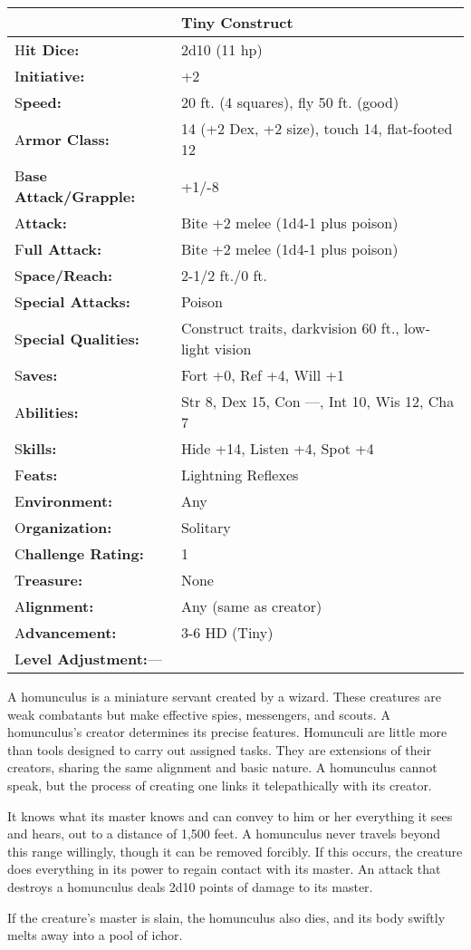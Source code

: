\documentclass{article}
\begin{document}
\begin{tabular}{|>{\raggedright}p{91pt}|>{\raggedright}p{199pt}|}
\hline
  & Tiny Construct\tabularnewline
\hline
H\textbf{it Dice:} & 2d10 (11 hp)\tabularnewline
\hline
I\textbf{nitiative:} & +2\tabularnewline
\hline
S\textbf{peed:} & 20 ft. (4 squares), fly 50 ft. (good)\tabularnewline
\hline
A\textbf{rmor Class:} & 14 (+2 Dex, +2 size), touch 14, flat-footed 12\tabularnewline
\hline
B\textbf{ase Attack/Grapple:} & +1/-8\tabularnewline
\hline
A\textbf{ttack:} & Bite +2 melee (1d4-1 plus poison)\tabularnewline
\hline
F\textbf{ull Attack:} & Bite +2 melee (1d4-1 plus poison)\tabularnewline
\hline
S\textbf{pace/Reach:} & 2-1/2 ft./0 ft.\tabularnewline
\hline
S\textbf{pecial Attacks:} & Poison\tabularnewline
\hline
S\textbf{pecial Qualities:} & Construct traits, darkvision 60 ft., low-light vision\tabularnewline
\hline
S\textbf{aves:} & Fort +0, Ref +4, Will +1\tabularnewline
\hline
A\textbf{bilities:} & Str 8, Dex 15, Con ---, Int 10, Wis 12, Cha 7\tabularnewline
\hline
S\textbf{kills:} & Hide +14, Listen +4, Spot +4 \tabularnewline
\hline
F\textbf{eats:} & Lightning Reflexes\tabularnewline
\hline
E\textbf{nvironment:} & Any\tabularnewline
\hline
O\textbf{rganization:} & Solitary\tabularnewline
\hline
C\textbf{hallenge Rating:} & 1\tabularnewline
\hline
T\textbf{reasure:} & None\tabularnewline
\hline
A\textbf{lignment:} & Any (same as creator)\tabularnewline
\hline
A\textbf{dvancement:} & 3-6 HD (Tiny)\tabularnewline
\hline
L\textbf{evel Adjustment:}--- & \tabularnewline
\hline
\end{tabular}

A homunculus is a miniature servant created by a wizard. These creatures are weak 
combatants but make effective spies, messengers, and scouts. A homunculus's creator 
determines its precise features. Homunculi are little more than tools designed 
to carry out assigned tasks. They are extensions of their creators, sharing the 
same alignment and basic nature. A homunculus cannot speak, but the process of 
creating one links it telepathically with its creator.

It knows what its master knows and can convey to him or her everything it sees 
and hears, out to a distance of 1,500 feet. A homunculus never travels beyond this 
range willingly, though it can be removed forcibly. If this occurs, the creature 
does everything in its power to regain contact with its master. An attack that 
destroys a homunculus deals 2d10 points of damage to its master.

If the creature's master is slain, the homunculus also dies, and its body swiftly 
melts away into a pool of ichor.
\end{document}
